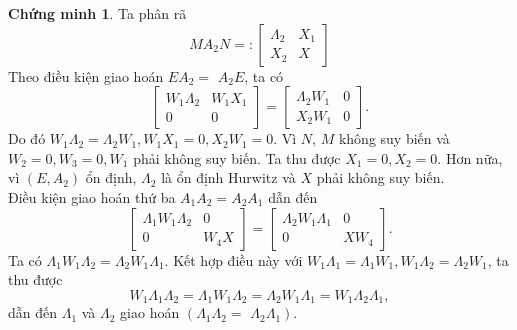\documentclass[12pt,a4paper]{report}
\theoremstyle{definition}
\newtheorem*{cv}{Chứng minh}
\theoremstyle{definition}
\numberwithin{dl}{chapter}
\numberwithin{vd}{chapter}
\numberwithin{corollary}{chapter}
\numberwithin{lemma}{chapter}
\numberwithin{md}{chapter}
\numberwithin{dn}{chapter}
\numberwithin{cy}{chapter}
\numberwithin{nx}{chapter}
\begin{document}
\begin{cv}
Ta phân rã
\begin{equation}\label{2.36}
M A_{2} N=:\left[\begin{array}{cc}
\Lambda_{2} & X_{1} \\
X_{2} & X
\end{array}\right] 
\end{equation}
Theo điều kiện giao hoán $E A_{2}=$ $A_{2} E$, ta có
\begin{equation}\label{2.37}
\left[\begin{array}{cc}
W_{1} \Lambda_{2} & W_{1} X_{1} \\
0 & 0
\end{array}\right]=\left[\begin{array}{cc}
\Lambda_{2} W_{1} & 0 \\
X_{2} W_{1} & 0
\end{array}\right]. 
\end{equation}
Do đó $W_{1} \Lambda_{2}=\Lambda_{2} W_{1}, W_{1} X_{1}=0, X_{2} W_{1}=0$. Vì $N$, $ M$ không suy biến và  $W_{2}=0, W_{3}=0, W_{1}$ phải không suy biến. Ta thu được $X_{1}=0, X_{2}=0$. Hơn nữa, vì $\left(E, A_{2}\right)$ ổn định, $\Lambda_{2}$ là ổn định Hurwitz và $X$ phải không suy biến.\\

Điều kiện giao hoán thứ ba $A_{1} A_{2}=A_{2} A_{1}$ dẫn đến
\begin{equation}\label{2.38}
\left[\begin{array}{cc}
\Lambda_{1} W_{1} \Lambda_{2} & 0 \\
0 & W_{4} X
\end{array}\right]=\left[\begin{array}{cc}
\Lambda_{2} W_{1} \Lambda_{1} & 0 \\
0 & X W_{4}
\end{array}\right] .
\end{equation}
Ta có $\Lambda_{1} W_{1} \Lambda_{2}=\Lambda_{2} W_{1} \Lambda_{1}$. Kết hợp điều này với $W_{1} \Lambda_{1}=\Lambda_{1} W_{1}, W_{1} \Lambda_{2}=\Lambda_{2} W_{1}$, ta thu được
\begin{equation}\label{2.39}
W_{1} \Lambda_{1} \Lambda_{2}=\Lambda_{1} W_{1} \Lambda_{2}=\Lambda_{2} W_{1} \Lambda_{1}=W_{1} \Lambda_{2} \Lambda_{1},
\end{equation}
dẫn đến $\Lambda_{1}$ và $\Lambda_{2}$ giao hoán $\left(\Lambda_{1} \Lambda_{2}=\right.$ $\left.\Lambda_{2} \Lambda_{1}\right)$.


\end{cv}
\end{document}
